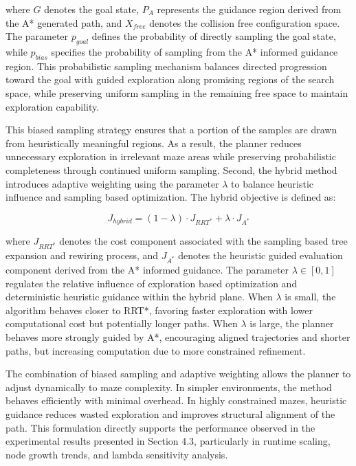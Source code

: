\documentclass[a4paper,12pt,one side]{report}
\theoremstyle{definition}
\begin{document}
\begin{itemize}
where $G$ denotes the goal state, $P_A$ represents the guidance region derived from the A* generated path, and $X_{free}$ denotes the collision free configuration space. The parameter $p_{goal}$ defines the probability of directly sampling the goal state, while $p_{bias}$ specifies the probability of sampling from the A* informed guidance region. This probabilistic sampling mechanism balances directed progression toward the goal with guided exploration along promising regions of the search space, while preserving uniform sampling in the remaining free space to maintain exploration capability.

This biased sampling strategy ensures that a portion of the samples are drawn from heuristically meaningful regions. As a result, the planner reduces unnecessary exploration in irrelevant maze areas while preserving probabilistic completeness through continued uniform sampling. Second, the hybrid method introduces adaptive weighting using the parameter $\lambda$ to balance heuristic influence and sampling based optimization. The hybrid objective is defined as:

\begin{equation}
J_{hybrid} = (1 - \lambda) \cdot J_{RRT^*} + \lambda \cdot J_{A^*}
\end{equation}

where $J_{RRT^*}$ denotes the cost component associated with the sampling based tree expansion and rewiring process, and $J_{A^*}$ denotes the heuristic guided evaluation component derived from the A* informed guidance. The parameter $\lambda \in [0,1]$ regulates the relative influence of exploration based optimization and deterministic heuristic guidance within the hybrid plane. When $\lambda$ is small, the algorithm behaves closer to RRT*, favoring faster exploration with lower computational cost but potentially longer paths. When $\lambda$ is large, the planner behaves more strongly guided by A*, encouraging aligned trajectories and shorter paths, but increasing computation due to more constrained refinement.

The combination of biased sampling and adaptive weighting allows the planner to adjust dynamically to maze complexity. In simpler environments, the method behaves efficiently with minimal overhead. In highly constrained mazes, heuristic guidance reduces wasted exploration and improves structural alignment of the path. This formulation directly supports the performance observed in the experimental results presented in Section 4.3, particularly in runtime scaling, node growth trends, and lambda sensitivity analysis.


\end{itemize}
\end{document}
